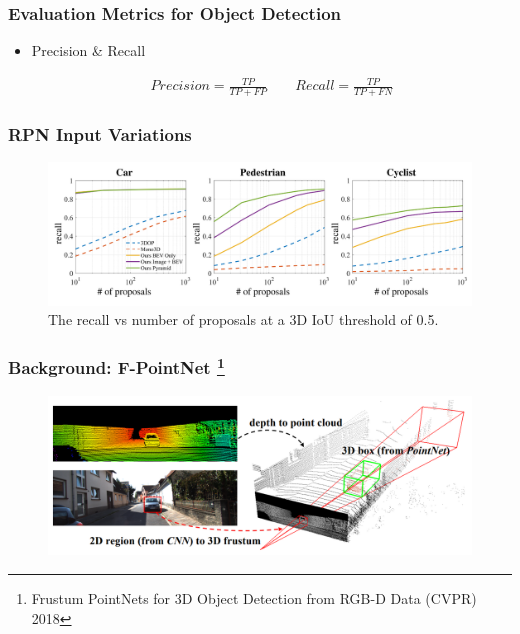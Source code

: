 \documentclass[10pt,fleqn,unknownkeysallowed]{beamer}
\begin{document}
\begin{frame}
	\frametitle{Evaluation Metrics for Object Detection}
	\begin{itemize}
		\item{Precision \& Recall}
	\begin{center}
		\begin{align*}
		Precision = \frac{TP}{TP + FP} \quad \quad Recall = \frac{TP}{TP + FN}
		\end{align*}
	\end{center}
	\end{itemize}
\end{frame}

\begin{frame}
	\frametitle{RPN Input Variations}
	\begin{figure}
		\hspace{-1.16cm} 
			\includegraphics[width=1.08\textwidth]{images/pdfs/RPN_Results.pdf}
			\caption{The recall vs number of proposals at a 3D IoU threshold of 0.5.}
	\end{figure}
\end{frame}

\begin{frame}
	\frametitle{Background: F-PointNet \footnote{Frustum PointNets for 3D Object Detection from RGB-D Data (CVPR) 2018}}
	\begin{figure}
		\begin{center}
			\includegraphics[width=1.0\linewidth]{images/fpoint_net} \\
		\end{center}
	\end{figure}
\end{frame}
\end{document}
